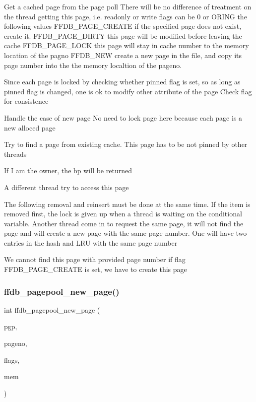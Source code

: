 Get a cached page from the page poll There will be no difference of treatment on the thread getting this page, i.\+e. readonly or write flags can be 0 or OR\textquotesingle{}I\+NG the following values F\+F\+D\+B\+\_\+\+P\+A\+G\+E\+\_\+\+C\+R\+E\+A\+TE if the specified page does not exist, create it. F\+F\+D\+B\+\_\+\+P\+A\+G\+E\+\_\+\+D\+I\+R\+TY this page will be modified before leaving the cache F\+F\+D\+B\+\_\+\+P\+A\+G\+E\+\_\+\+L\+O\+CK this page will stay in cache number to the memory location of the pagno F\+F\+D\+B\+\_\+\+N\+EW create a new page in the file, and copy its page number into the the memory localtion of the pageno.

Since each page is locked by checking whether pinned flag is set, so as long as pinned flag is changed, one is ok to modify other attribute of the page Check flag for consistence

Handle the case of new page No need to lock page here because each page is a new alloced page

Try to find a page from existing cache. This page has to be not pinned by other threads

If I am the owner, the bp will be returned

A different thread try to access this page

The following removal and reinsert must be done at the same time. If the item is removed first, the lock is given up when a thread is waiting on the conditional variable. Another thread come in to request the same page, it will not find the page and will create a new page with the same page number. One will have two entries in the hash and L\+RU with the same page number

We cannot find this page with provided page number if flag F\+F\+D\+B\+\_\+\+P\+A\+G\+E\+\_\+\+C\+R\+E\+A\+TE is set, we have to create this page\mbox{\label{adat-devel_2other__libs_2filedb_2filehash_2ffdb__pagepool_8c_a64907f28abdad3f859641b235e76bb42}} 
\subsubsection{\texorpdfstring{ffdb\_pagepool\_new\_page()}{ffdb\_pagepool\_new\_page()}}
{\footnotesize\ttfamily int ffdb\+\_\+pagepool\+\_\+new\+\_\+page (\begin{DoxyParamCaption}\item[{\mbox{\hyperlink{adat-devel_2other__libs_2filedb_2filehash_2ffdb__pagepool_8h_a73290f737b0e5f8be90a0fa96ddf6ab6}{ffdb\+\_\+pagepool\+\_\+t}} $\ast$}]{pgp,  }\item[{\mbox{\hyperlink{adat-devel_2other__libs_2filedb_2filehash_2ffdb__db_8h_a000813331643d38481142bcce7de1501}{pgno\+\_\+t}} $\ast$}]{pageno,  }\item[{unsigned int}]{flags,  }\item[{void $\ast$$\ast$}]{mem }\end{DoxyParamCaption})}

